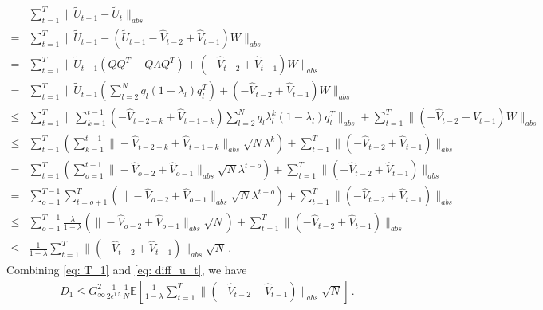 \documentclass[anon,12pt]{colt2021} %
\begin{document}
\begin{align}\label{eq: diff_u_t}
& \sum_{t=1}^T   \|{{\tilde U_{t-1}}} - {{\tilde U_{t}}\|_{abs}} \nonumber \\
= &       \sum_{t=1}^T   \|{{\tilde U_{t-1}}} - (\tilde U_{t-1}  - \hat V_{t-2} + \hat V_{t-1})W \|_{abs}    \nonumber  \\
= &   \sum_{t=1}^T   \|\tilde U_{t-1}(QQ^T-Q\Lambda Q^T)  + (- \hat V_{t-2} + \hat V_{t-1})W \|_{abs} \nonumber  \\
= &  \sum_{t=1}^T   \|\tilde U_{t-1}(\sum_{l=2}^N q_l (1-\lambda_l)q_l^T)  + (- \hat V_{t-2} + \hat V_{t-1})W\|_{abs}   \nonumber  \\
\leq &  \sum_{t=1}^T   \| \sum_{k=1}^{t-1} (- \hat V_{t-2-k} + \hat V_{t-1-k} ) \sum_{l=2}^N q_l \lambda_l^k  (1-\lambda_l)q_l^T  \|_{abs} + \sum_{t=1}^T  \| (- \hat V_{t-2} + \hat V_{t-1})W \|_{abs}     \nonumber \\
\leq &   \sum_{t=1}^T  \left(  \sum_{k=1}^{t-1} \|- \hat V_{t-2-k} + \hat V_{t-1-k}\|_{abs} \sqrt{N}\lambda^k \right)   + \sum_{t=1}^T  \| ( - \hat V_{t-2} + \hat V_{t-1}) \|_{abs}  \nonumber \\
=  &  \sum_{t=1}^T  \left(  \sum_{o=1}^{t-1} \|- \hat V_{o-2} + \hat V_{o-1}\|_{abs} \sqrt{N}\lambda^{t-o} \right)   + \sum_{t=1}^T  \| ( - \hat V_{t-2} + \hat V_{t-1}) \|_{abs}    \nonumber  \\
=  &\sum_{o=1}^{T-1}  \sum_{t=o+1}^T  \left(   \|- \hat V_{o-2} + \hat V_{o-1}\|_{abs} \sqrt{N}\lambda^{t-o} \right)   + \sum_{t=1}^T  \| ( - \hat V_{t-2} + \hat V_{t-1}) \|_{abs}   \nonumber \\
\leq &\sum_{o=1}^{T-1} \frac{\lambda}{1-\lambda}   \left(   \|- \hat V_{o-2} + \hat V_{o-1}\|_{abs} \sqrt{N}  \right)   + \sum_{t=1}^T  \| ( - \hat V_{t-2} + \hat V_{t-1}) \|_{abs}  \nonumber  \\
\leq & \frac{1}{1-\lambda}   \sum_{t=1}^T  \| ( - \hat V_{t-2} + \hat V_{t-1}) \|_{abs}  \sqrt{N}    \, .
\end{align}
Combining \eqref{eq: T_1} and \eqref{eq: diff_u_t}, we have
\begin{align}
D_1 \leq G_{\infty}^2 \frac{1}{2\epsilon^{1.5}} \frac{1}{N}   \mathbb E \left [  \frac{1}{1-\lambda}   \sum_{t=1}^T  \| ( - \hat V_{t-2} + \hat V_{t-1}) \|_{abs}  \sqrt{N} \right]\, .
\end{align}
\end{document}
